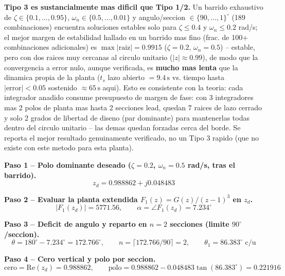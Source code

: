 \documentclass[11pt]{article}
\begin{document}
\begin{findingbox}
\textbf{Tipo 3 es sustancialmente mas dificil que Tipo 1/2.} Un barrido
exhaustivo de $\zeta\in\{0.1,\ldots,0.95\}$, $\omega_n\in\{0.5,\ldots,0.01\}$
y angulo/seccion $\in\{90,\ldots,1\}^\circ$ (189 combinaciones) encuentra
soluciones estables solo para $\zeta\le0.4$ y $\omega_n\le0.2$ rad/s; el
mejor margen de estabilidad hallado en un barrido mas fino (frac. de 100+
combinaciones adicionales) es $\max|\text{raiz}|=0.9915$ ($\zeta=0.2,\,
\omega_n=0.5$) -- estable, pero con dos raices muy cercanas al circulo
unitario ($|z|\approx0.99$), de modo que la convergencia a error nulo, aunque
verificada, es \textbf{mucho mas lenta} que la dinamica propia de la planta
($t_s$ lazo abierto $=9.4\,\mathrm s$ vs. tiempo hasta $|\text{error}|<0.05$
sostenido $\approx65\,\mathrm s$ aqui). Esto es consistente con la teoria: cada
integrador anadido consume presupuesto de margen de fase: con 3 integradores
mas 2 polos de planta mas hasta 2 secciones lead, quedan 7 raices de lazo
cerrado y solo 2 grados de libertad de diseno (par dominante) para
mantenerlas todas dentro del circulo unitario -- las demas quedan forzadas
cerca del borde. Se reporta el mejor resultado genuinamente verificado, no
un Tipo 3 rapido (que no existe con este metodo para esta planta).
\end{findingbox}

\textbf{Paso 1 -- Polo dominante deseado ($\zeta=0.2$, $\omega_n=0.5$ rad/s, tras el barrido).}
\begin{equation}
z_d=0.988862+j0.048483
\end{equation}

\textbf{Paso 2 -- Evaluar la planta extendida $F_1(z)=G(z)/(z-1)^3$ en $z_d$.}
\begin{equation}
|F_1(z_d)|=5771.56,\qquad \alpha=\angle F_1(z_d)=7.234^\circ
\end{equation}

\textbf{Paso 3 -- Deficit de angulo y reparto en $n=2$ secciones (limite $90^\circ$/seccion).}
\begin{equation}
\theta=180^\circ-7.234^\circ=172.766^\circ,\qquad n=\lceil172.766/90\rceil=2,\qquad
\theta_1=86.383^\circ\text{ c/u}
\end{equation}

\textbf{Paso 4 -- Cero vertical y polo por seccion.}
\begin{equation}
\text{cero}=\mathrm{Re}(z_d)=0.988862,\qquad
\text{polo}=0.988862-0.048483\tan(86.383^\circ)=0.221916
\end{equation}
\end{document}
